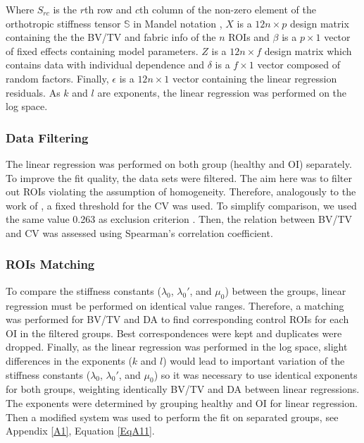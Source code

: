 \documentclass[a4paper,fleqn]{DC_ArtStyle}
\begin{document}
Where $S_{rc}$ is the $r$th row and $c$th column of the non-zero element of the orthotropic stiffness tensor $\mathbb{S}$ in Mandel notation \cite{MANDEL1965}, $X$ is a $12 n \times p$ design matrix containing the the BV/TV and fabric info of the $n$ ROIs and $\beta$ is a $p \times 1$ vector of fixed effects containing model parameters. $Z$ is a $12 n \times f$ design matrix which contains data with individual dependence and $\delta$ is a $f \times 1$ vector composed of random factors. Finally, $\epsilon$ is a $12n \times 1$ vector containing the linear regression residuals. As $k$ and $l$ are exponents, the linear regression was performed on the log space.\\

\subsubsection{Data Filtering}
The linear regression was performed on both group (heal\-thy and OI) separately. To improve the fit quality, the data sets were filtered. The aim here was to filter out ROIs violating the assumption of homogeneity. Therefore, analogously to the work of \citeauthor{Panyasantisuk2015}\cite{Panyasantisuk2015}, a fixed threshold for the CV was used. To simplify comparison, we used the same value 0.263 as exclusion criterion \cite{Panyasantisuk2015}. Then, the relation between BV/TV and CV was assessed using Spearman's correlation coefficient. 

\subsubsection{ROIs Matching}
To compare the stiffness constants ($\lambda_0$, $\lambda_0'$, and $\mu_0$) between the groups, linear regression must be performed on identical value ranges. Therefore, a matching was performed for BV/TV and DA to find corresponding control ROIs for each OI in the filtered groups. Best correspondences were kept and duplicates were dropped. Finally, as the linear regression was performed in the log space, slight differences in the exponents ($k$ and $l$) would lead to important variation of the stiffness constants ($\lambda_0$, $\lambda_0'$, and $\mu_0$) so it was necessary to use identical exponents  for both groups, weighting identically BV/TV and DA between linear regressions. The exponents were determined by grouping healthy and OI for linear regression. Then a modified system was used to perform the fit on separated groups, see Appendix \ref{A1}, Equation \ref{EqA11}.\\
\end{document}

